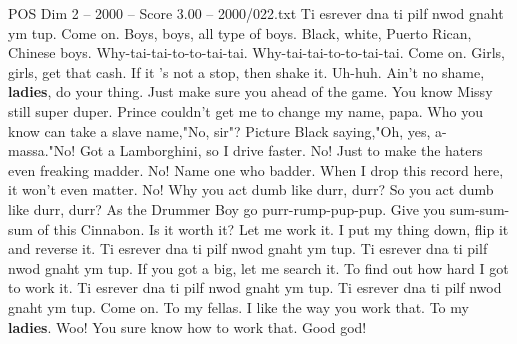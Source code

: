 \begin{textsample}{POS Dim 2 – 2000 – Score 3.00 – 2000/022.txt}
Ti esrever dna ti pilf nwod gnaht ym tup.
Come on.
Boys, boys, all type of boys.
Black, white, Puerto Rican, Chinese boys.
Why-tai-tai-to-to-tai-tai.
Why-tai-tai-to-to-tai-tai.
Come on.
Girls, girls, get that cash.
If it 's not a stop, then shake it.
Uh-huh.
Ain't no shame, \textbf{ladies}, do your thing.
Just make sure you ahead of the game.
You know Missy still super duper.
Prince couldn't get me to change my name, papa.
Who you know can take a slave name,"No, sir"?
Picture Black saying,"Oh, yes, a-massa."No!
Got a Lamborghini, so I drive faster.
No!
Just to make the haters even freaking madder.
No!
Name one who badder.
When I drop this record here, it won't even matter.
No!
Why you act dumb like durr, durr?
So you act dumb like durr, durr?
As the Drummer Boy go purr-rump-pup-pup.
Give you sum-sum-sum of this Cinnabon.
Is it worth it?
Let me work it.
I put my thing down, flip it and reverse it.
Ti esrever dna ti pilf nwod gnaht ym tup.
Ti esrever dna ti pilf nwod gnaht ym tup.
If you got a big, let me search it.
To find out how hard I got to work it.
Ti esrever dna ti pilf nwod gnaht ym tup.
Ti esrever dna ti pilf nwod gnaht ym tup.
Come on.
To my fellas.
I like the way you work that.
To my \textbf{ladies}.
Woo!
You sure know how to work that.
Good god!

\end{textsample}
